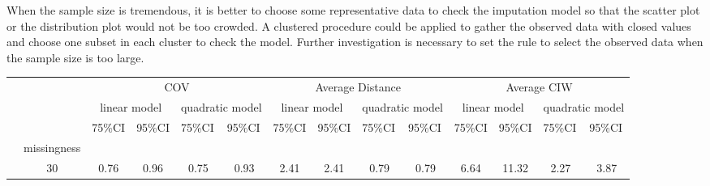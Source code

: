 \documentclass[12pt, fullpage, a4paper]{article}
\begin{document}
When the sample size is tremendous, it is better to choose some representative data to check the imputation model so that the scatter plot or the distribution plot would not be too crowded. A clustered procedure could be applied to gather the observed data with closed values and choose one subset in each cluster to check the model. Further investigation is necessary to set the rule to select the observed data when the sample size is too large.


\newpage



\newpage
\begin{table}
	\begin{tabular}{cc|cccc|cccc|cccc}
		\multicolumn{2}{l|}{}                             & \multicolumn{4}{c|}{COV}                                                                                           & \multicolumn{4}{c|}{Average Distance}                                                                              & \multicolumn{4}{c}{Average CIW}                                                                                   \\ \cline{3-14} 
		\multicolumn{1}{l}{}      & \multicolumn{1}{l|}{} & \multicolumn{2}{c}{linear model}                        & \multicolumn{2}{c|}{quadratic model}                     & \multicolumn{2}{c}{linear model}                        & \multicolumn{2}{c|}{quadratic model}                     & \multicolumn{2}{c}{linear model}                        & \multicolumn{2}{c}{quadratic model}                     \\ \hline
		\multicolumn{1}{l|}{}     & \multicolumn{1}{l|}{} & \multicolumn{1}{l}{75\%CI} & \multicolumn{1}{l}{95\%CI} & \multicolumn{1}{l}{75\%CI} & \multicolumn{1}{l|}{95\%CI} & \multicolumn{1}{l}{75\%CI} & \multicolumn{1}{l}{95\%CI} & \multicolumn{1}{l}{75\%CI} & \multicolumn{1}{l|}{95\%CI} & \multicolumn{1}{l}{75\%CI} & \multicolumn{1}{l}{95\%CI} & \multicolumn{1}{l}{75\%CI} & \multicolumn{1}{l}{95\%CI} \\
		\multicolumn{1}{c|}{}     & missingness           &                            &                            &                            &                             &                            &                            &                            &                             &                            &                            &                            &                            \\ \cline{2-14} 
		\multicolumn{1}{c|}{}     & 30                    & 0.76                       & 0.96                       & 0.75                       & 0.93                        & 2.41                       & 2.41                       & 0.79                       & 0.79                        & 6.64                       & 11.32                      & 2.27                       & 3.87                       \\

\end{tabular}
\end{table}
\end{document}
